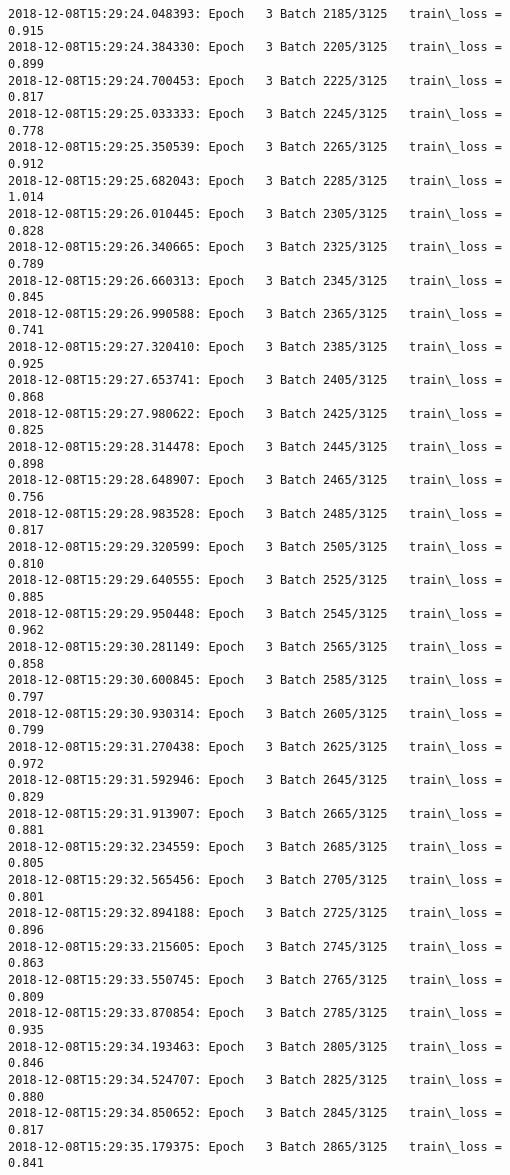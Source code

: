 \documentclass[11pt]{article}
\begin{document}
\begin{Verbatim}[commandchars=\\\{\}]
2018-12-08T15:29:24.048393: Epoch   3 Batch 2185/3125   train\_loss = 0.915
2018-12-08T15:29:24.384330: Epoch   3 Batch 2205/3125   train\_loss = 0.899
2018-12-08T15:29:24.700453: Epoch   3 Batch 2225/3125   train\_loss = 0.817
2018-12-08T15:29:25.033333: Epoch   3 Batch 2245/3125   train\_loss = 0.778
2018-12-08T15:29:25.350539: Epoch   3 Batch 2265/3125   train\_loss = 0.912
2018-12-08T15:29:25.682043: Epoch   3 Batch 2285/3125   train\_loss = 1.014
2018-12-08T15:29:26.010445: Epoch   3 Batch 2305/3125   train\_loss = 0.828
2018-12-08T15:29:26.340665: Epoch   3 Batch 2325/3125   train\_loss = 0.789
2018-12-08T15:29:26.660313: Epoch   3 Batch 2345/3125   train\_loss = 0.845
2018-12-08T15:29:26.990588: Epoch   3 Batch 2365/3125   train\_loss = 0.741
2018-12-08T15:29:27.320410: Epoch   3 Batch 2385/3125   train\_loss = 0.925
2018-12-08T15:29:27.653741: Epoch   3 Batch 2405/3125   train\_loss = 0.868
2018-12-08T15:29:27.980622: Epoch   3 Batch 2425/3125   train\_loss = 0.825
2018-12-08T15:29:28.314478: Epoch   3 Batch 2445/3125   train\_loss = 0.898
2018-12-08T15:29:28.648907: Epoch   3 Batch 2465/3125   train\_loss = 0.756
2018-12-08T15:29:28.983528: Epoch   3 Batch 2485/3125   train\_loss = 0.817
2018-12-08T15:29:29.320599: Epoch   3 Batch 2505/3125   train\_loss = 0.810
2018-12-08T15:29:29.640555: Epoch   3 Batch 2525/3125   train\_loss = 0.885
2018-12-08T15:29:29.950448: Epoch   3 Batch 2545/3125   train\_loss = 0.962
2018-12-08T15:29:30.281149: Epoch   3 Batch 2565/3125   train\_loss = 0.858
2018-12-08T15:29:30.600845: Epoch   3 Batch 2585/3125   train\_loss = 0.797
2018-12-08T15:29:30.930314: Epoch   3 Batch 2605/3125   train\_loss = 0.799
2018-12-08T15:29:31.270438: Epoch   3 Batch 2625/3125   train\_loss = 0.972
2018-12-08T15:29:31.592946: Epoch   3 Batch 2645/3125   train\_loss = 0.829
2018-12-08T15:29:31.913907: Epoch   3 Batch 2665/3125   train\_loss = 0.881
2018-12-08T15:29:32.234559: Epoch   3 Batch 2685/3125   train\_loss = 0.805
2018-12-08T15:29:32.565456: Epoch   3 Batch 2705/3125   train\_loss = 0.801
2018-12-08T15:29:32.894188: Epoch   3 Batch 2725/3125   train\_loss = 0.896
2018-12-08T15:29:33.215605: Epoch   3 Batch 2745/3125   train\_loss = 0.863
2018-12-08T15:29:33.550745: Epoch   3 Batch 2765/3125   train\_loss = 0.809
2018-12-08T15:29:33.870854: Epoch   3 Batch 2785/3125   train\_loss = 0.935
2018-12-08T15:29:34.193463: Epoch   3 Batch 2805/3125   train\_loss = 0.846
2018-12-08T15:29:34.524707: Epoch   3 Batch 2825/3125   train\_loss = 0.880
2018-12-08T15:29:34.850652: Epoch   3 Batch 2845/3125   train\_loss = 0.817
2018-12-08T15:29:35.179375: Epoch   3 Batch 2865/3125   train\_loss = 0.841

\end{Verbatim}
\end{document}
